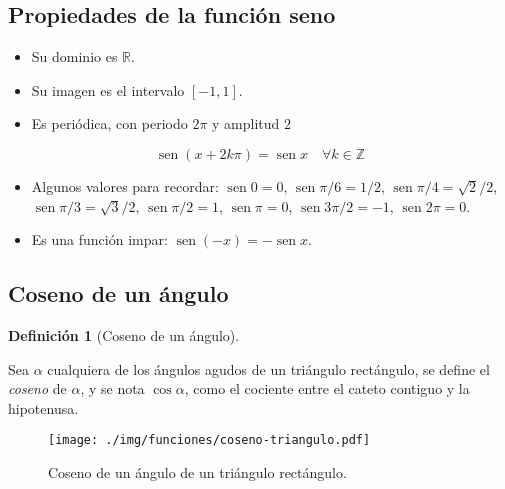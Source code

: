 \documentclass[
  a4paper,
]{scrreport}
\providecommand{\tightlist}{%
  \setlength{\itemsep}{0pt}\setlength{\parskip}{0pt}}\usepackage{longtable,booktabs,array}
\theoremstyle{definition}
\theoremstyle{definition}
\theoremstyle{definition}
\newtheorem{definition}{Definición}[chapter]
\theoremstyle{plain}
\theoremstyle{plain}
\theoremstyle{plain}
\theoremstyle{remark}
\begin{document}
\subsection{Propiedades de la función
seno}\label{propiedades-de-la-funciuxf3n-seno}

\begin{itemize}
\tightlist
\item
  Su dominio es \(\mathbb{R}\).
\item
  Su imagen es el intervalo \([-1,1]\).
\item
  Es periódica, con periodo \(2\pi\) y amplitud \(2\)
\end{itemize}

\[\operatorname{sen} (x+2k\pi)= \operatorname{sen} x\quad \forall k\in \mathbb{Z}\]

\begin{itemize}
\tightlist
\item
  Algunos valores para recordar: \(\operatorname{sen} 0=0\),
  \(\operatorname{sen} \pi/6= 1/2\),
  \(\operatorname{sen} \pi/4=\sqrt{2}/2\),
  \(\operatorname{sen} \pi/3= \sqrt{3}/2\),
  \(\operatorname{sen} \pi/2 =1\), \(\operatorname{sen} \pi = 0\),
  \(\operatorname{sen} 3\pi/2=-1\), \(\operatorname{sen} 2\pi=0\).
\item
  Es una función impar:
  \(\operatorname{sen}(-x)=-\operatorname{sen} x\).
\end{itemize}

\subsection{Coseno de un ángulo}\label{coseno-de-un-uxe1ngulo}

\begin{definition}[Coseno de un
ángulo]\protect\hypertarget{def-coseno-angulo}{}\label{def-coseno-angulo}

Sea \(\alpha\) cualquiera de los ángulos agudos de un triángulo
rectángulo, se define el \emph{coseno} de \(\alpha\), y se nota
\(\cos \alpha\), como el cociente entre el cateto contiguo y la
hipotenusa.

\end{definition}

\begin{figure}[H]

{\centering \texttt{[image: ./img/funciones/coseno-triangulo.pdf]}

}

\caption{Coseno de un ángulo de un triángulo rectángulo.}

\end{figure}%
\end{document}
